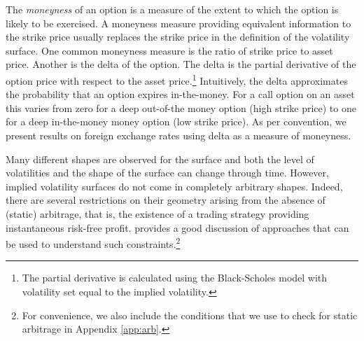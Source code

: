\documentclass[12pt]{article}
\begin{document}
The \textit{moneyness} of an option is a measure of the extent to which the option is likely to be exercised. A moneyness measure providing equivalent information to the strike price usually replaces the strike price in the definition of the volatility surface. One common moneyness measure is the ratio of strike price to asset price. Another is the delta of the option. The delta is the partial derivative of the option price with respect to the asset price.\footnote{The partial derivative is calculated using the Black-Scholes model with volatility set equal to the implied volatility.} Intuitively, the delta approximates the probability that an option expires in-the-money. For a call option on an asset this varies from zero for a deep out-of-the money option (high strike price) to one for a deep in-the-money money option (low strike price). As per convention, we present results on foreign exchange rates using delta as a measure of moneyness. 

Many different shapes are observed for the surface and both the level of volatilities and the shape of the surface can change through time. However, implied volatility surfaces do not come in completely arbitrary shapes. Indeed, there are several restrictions on their geometry arising from the absence of (static) arbitrage, that is, the existence of a trading strategy providing instantaneous risk-free profit. \citet{lucic} provides a good discussion of approaches that can be used to
understand such constraints.\footnote{For convenience, we also include the conditions that we use to check for static arbitrage in Appendix \ref{app:arb}.}


\end{document}
